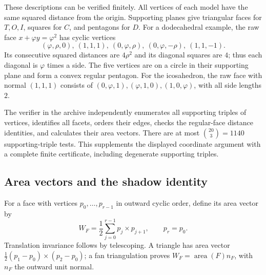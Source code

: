\documentclass[11pt,a4paper]{article}
\newcommand{\ph}{\varphi}
\newcommand{\rr}{\rho}
\newcommand{\area}{\operatorname{area}}
\begin{document}
These descriptions can be verified finitely. All vertices of each model have the same squared distance from the origin. Supporting planes give triangular faces for $T,O,I$, squares for $C$, and pentagons for $D$. For a dodecahedral example, the raw face $x+\ph y=\ph^2$ has cyclic vertices
\[
 (\ph,\rr,0),\ (1,1,1),\ (0,\ph,\rr),\ (0,\ph,-\rr),\ (1,1,-1).
\]
Its consecutive squared distances are $4\rr^2$ and its diagonal squares are $4$; thus each diagonal is $\ph$ times a side. The five vertices are on a circle in their supporting plane and form a convex regular pentagon. For the icosahedron, the raw face with normal $(1,1,1)$ consists of $(0,\ph,1),(\ph,1,0),(1,0,\ph)$, with all side lengths $2$.

The verifier in the archive independently enumerates all supporting triples of vertices, identifies all facets, orders their edges, checks the regular-face distance identities, and calculates their area vectors. There are at most $\binom{20}{3}=1140$ supporting-triple tests. This supplements the displayed coordinate argument with a complete finite certificate, including degenerate supporting triples.

\subsection{Area vectors and the shadow identity}
For a face with vertices $p_0,\ldots,p_{r-1}$ in outward cyclic order, define its area vector by
\begin{equation}
 W_F=\frac12\sum_{j=0}^{r-1}p_j\times p_{j+1},\qquad p_r=p_0.
 \label{eq:areavector}
\end{equation}
Translation invariance follows by telescoping. A triangle has area vector
$\frac12(p_1-p_0)\times(p_2-p_0)$; a fan triangulation proves
$W_F=\area(F)n_F$, with $n_F$ the outward unit normal.
\end{document}
